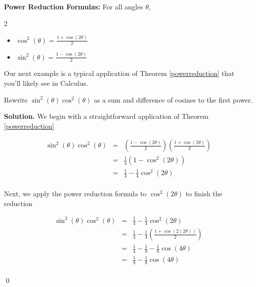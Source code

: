 \documentclass{ximera}
\begin{document}
\begin{theorem} \label{powerreduction}  \textbf{Power Reduction Formulas:} For all angles $\theta$, 

\begin{multicols}{2}

\begin{itemize}

\item  $\cos^{2}(\theta) =  \frac{1 + \cos(2\theta)}{2}$

\item  $\sin^{2}(\theta) =  \frac{1 - \cos(2\theta)}{2}$

\end{itemize}

\end{multicols}

\end{theorem}

 


 

Our next example is a typical application of Theorem \ref{powerreduction} that you'll likely see in Calculus.

 

\begin{example} \label{powerreductionex} Rewrite $\sin^{2}(\theta) \cos^{2}(\theta)$ as a sum and difference of cosines to the first power.

\medskip

{\bf Solution.} We begin with a straightforward application of Theorem \ref{powerreduction}

\[ \begin{array}{rcl}

\sin^{2}(\theta) \cos^{2}(\theta) & = & \left(  \frac{1 - \cos(2\theta)}{2} \right) \left(  \frac{1 + \cos(2\theta)}{2} \right) \\  
																  & = &  \frac{1}{4}\left(1 - \cos^{2}(2\theta)\right) \\   
																  & = &  \frac{1}{4} -  \frac{1}{4}\cos^{2}(2\theta) \\ 
\end{array} \]

Next, we apply the power reduction formula to $\cos^{2}(2\theta)$ to finish the reduction

\[ \begin{array}{rcl}

\sin^{2}(\theta) \cos^{2}(\theta)  & = &  \frac{1}{4} -  \frac{1}{4}\cos^{2}(2\theta) \\  
																	 & = &  \frac{1}{4} -  \frac{1}{4} \left( \frac{1 + \cos(2(2\theta))}{2}\right) \\  
																	 & = &  \frac{1}{4} -  \frac{1}{8}  -  \frac{1}{8}\cos(4\theta) \\  
																	 & = &  \frac{1}{8} -  \frac{1}{8}\cos(4\theta) \\ 
\end{array} \]

\vspace{-.25in} \qed

\end{example}
\end{document}
